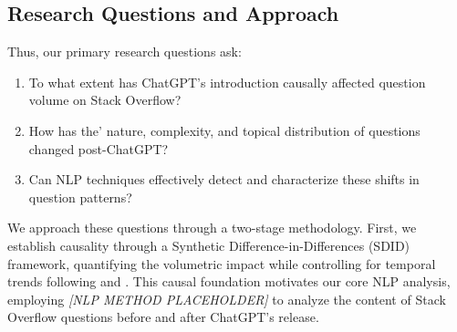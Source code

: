 
\subsection{Research Questions and Approach}
Thus, our primary research questions ask: 
\begin{enumerate}
    \item To what extent has ChatGPT's introduction causally affected question volume on Stack Overflow?
    \item How has the' nature, complexity, and topical distribution of questions changed post-ChatGPT?
    \item Can NLP techniques effectively detect and characterize these shifts in question patterns?
\end{enumerate}

We approach these questions through a two-stage methodology. First, we establish causality through a Synthetic Difference-in-Differences (SDID) framework, quantifying the volumetric impact while controlling for temporal trends following \textcite{arkhangelsky_synthetic_2021} and \textcite{clarke_synthetic_2023}. This causal foundation motivates our core NLP analysis, employing \textit{[NLP METHOD PLACEHOLDER]} to analyze the content of Stack Overflow questions before and after ChatGPT's release.
